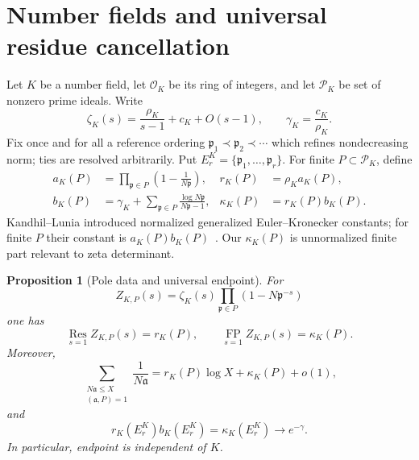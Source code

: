 \documentclass[11pt]{article}
\newtheorem{proposition}[theorem]{Proposition}
\theoremstyle{definition}
\theoremstyle{remark}
\newcommand{\Res}{\operatorname*{Res}}
\newcommand{\FP}{\operatorname*{FP}}
\begin{document}
\section{Number fields and universal residue cancellation}
\label{sec:numberfields}

Let $K$ be a number field, let $\mathcal O_K$ be its ring of integers, and let
$\mathcal P_K$ be set of nonzero prime ideals.  Write
\begin{equation}
 \zeta_K(s)=\frac{\rho_K}{s-1}+c_K+O(s-1),\qquad
 \gamma_K=\frac{c_K}{\rho_K}.                            \tag{8.1}
\end{equation}
Fix once and for all a reference ordering
$\mathfrak p_1\prec\mathfrak p_2\prec\cdots$ which refines nondecreasing norm; ties are resolved
arbitrarily.  Put $E_r^K=\{\mathfrak p_1,\ldots,\mathfrak p_r\}$.  For finite
$P\subset\mathcal P_K$, define
\begin{align}
 a_K(P)&=\prod_{\mathfrak p\in P}\left(1-\frac1{N\mathfrak p}\right),
 &r_K(P)&=\rho_Ka_K(P),                                  \tag{8.2}\\
 b_K(P)&=\gamma_K+\sum_{\mathfrak p\in P}
                   \frac{\log N\mathfrak p}{N\mathfrak p-1},
 &\kappa_K(P)&=r_K(P)b_K(P).                             \tag{8.3}
\end{align}
Kandhil--Lunia introduced normalized generalized Euler--Kronecker constants; for finite $P$ their
constant is $a_K(P)b_K(P)$~\cite{KandhilLunia2024}.  Our $\kappa_K(P)$ is unnormalized finite
part relevant to zeta determinant.

\begin{proposition}[Pole data and universal endpoint]
\label{prop:K-pole}
For
\begin{equation}
 Z_{K,P}(s)=\zeta_K(s)\prod_{\mathfrak p\in P}
                    (1-N\mathfrak p^{-s})                \tag{8.4}
\end{equation}
one has
\begin{equation}
 \Res_{s=1}Z_{K,P}(s)=r_K(P),\qquad
 \FP_{s=1}Z_{K,P}(s)=\kappa_K(P).                        \tag{8.5}
\end{equation}
Moreover,
\begin{equation}
 \sum_{\substack{N\mathfrak a\leq X\\(\mathfrak a,P)=1}}
 \frac1{N\mathfrak a}
 =r_K(P)\log X+\kappa_K(P)+o(1),                         \tag{8.6}
\end{equation}
and
\begin{equation}
 r_K(E_r^K)b_K(E_r^K)=\kappa_K(E_r^K)\longrightarrow e^{-\gamma}.
                                                                    \tag{8.7}
\end{equation}
In particular, endpoint is independent of $K$.
\end{proposition}
\end{document}
